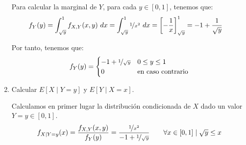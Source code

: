 \begin{ejercicio}
\begin{enumerate}
\begin{figure}[H]
        \end{figure}

        Para calcular la marginal de $Y$, para cada $y\in[0,1]$, tenemos que:
        \begin{align*}
            f_Y(y) &= \int_{\sqrt{y}}^{1} f_{X,Y}(x,y) \ dx
            = \int_{\sqrt{y}}^{1} \nicefrac{1}{x^2} \ dx
            = \left[-\frac{1}{x}\right]_{\sqrt{y}}^{1}
            = -1 + \frac{1}{\sqrt{y}}
        \end{align*}

        Por tanto, tenemos que:
        \begin{equation*}
            f_Y(y) = \begin{cases}
                -1 + \nicefrac{1}{\sqrt{y}} & 0\leq y\leq 1\\
                0 & \text{en caso contrario}
            \end{cases}
        \end{equation*}

        \item Calcular $E[X\mid Y = y]$ y $E[Y\mid X = x]$.
        
        Calculamos en primer lugar la distribución condicionada de $X$ dado un valor $Y = y\in [0,1]$.
        \begin{equation*}
            f_{X\mid Y=y}(x) = \dfrac{f_{X,Y}(x,y)}{f_Y(y)}
            = \dfrac{\nicefrac{1}{x^2}}{-1 + \nicefrac{1}{\sqrt{y}}}
            \qquad \forall x\in[0,1] \mid \sqrt{y}\leq x
        \end{equation*}


\end{enumerate}
\end{ejercicio}
